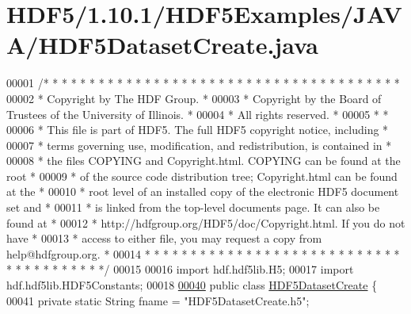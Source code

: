 \hypertarget{_h_d_f5_21_810_81_2_h_d_f5_examples_2_j_a_v_a_2_h_d_f5_dataset_create_8java_source}{}\section{H\+D\+F5/1.10.1/\+H\+D\+F5\+Examples/\+J\+A\+V\+A/\+H\+D\+F5\+Dataset\+Create.java}
\label{_h_d_f5_21_810_81_2_h_d_f5_examples_2_j_a_v_a_2_h_d_f5_dataset_create_8java_source}

\begin{DoxyCode}
00001 \textcolor{comment}{/* * * * * * * * * * * * * * * * * * * * * * * * * * * * * * * * * * * * * * *}
00002 \textcolor{comment}{ * Copyright by The HDF Group.                                               *}
00003 \textcolor{comment}{ * Copyright by the Board of Trustees of the University of Illinois.         *}
00004 \textcolor{comment}{ * All rights reserved.                                                      *}
00005 \textcolor{comment}{ *                                                                           *}
00006 \textcolor{comment}{ * This file is part of HDF5.  The full HDF5 copyright notice, including     *}
00007 \textcolor{comment}{ * terms governing use, modification, and redistribution, is contained in    *}
00008 \textcolor{comment}{ * the files COPYING and Copyright.html.  COPYING can be found at the root   *}
00009 \textcolor{comment}{ * of the source code distribution tree; Copyright.html can be found at the  *}
00010 \textcolor{comment}{ * root level of an installed copy of the electronic HDF5 document set and   *}
00011 \textcolor{comment}{ * is linked from the top-level documents page.  It can also be found at     *}
00012 \textcolor{comment}{ * http://hdfgroup.org/HDF5/doc/Copyright.html.  If you do not have          *}
00013 \textcolor{comment}{ * access to either file, you may request a copy from help@hdfgroup.org.     *}
00014 \textcolor{comment}{ * * * * * * * * * * * * * * * * * * * * * * * * * * * * * * * * * * * * * * */}
00015 
00016 \textcolor{keyword}{import} hdf.hdf5lib.H5;
00017 \textcolor{keyword}{import} hdf.hdf5lib.HDF5Constants;
00018 
\hyperlink{class_h_d_f5_dataset_create}{00040} \textcolor{keyword}{public} \textcolor{keyword}{class }\hyperlink{class_h_d_f5_dataset_create}{HDF5DatasetCreate} \{
00041     \textcolor{keyword}{private} \textcolor{keyword}{static} String fname  = \textcolor{stringliteral}{"HDF5DatasetCreate.h5"};

\end{DoxyCode}
